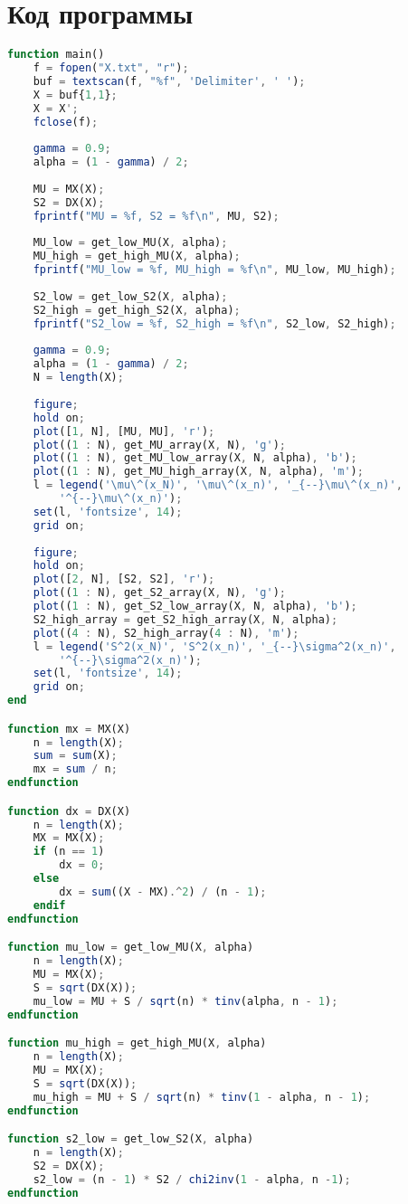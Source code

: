 \chapter{Код программы}

\begin{lstlisting}[language=octave]
function main()
	f = fopen("X.txt", "r");
	buf = textscan(f, "%f", 'Delimiter', ' ');
	X = buf{1,1};
	X = X';
	fclose(f);
	
	gamma = 0.9;
	alpha = (1 - gamma) / 2;
	
	MU = MX(X);
	S2 = DX(X);
	fprintf("MU = %f, S2 = %f\n", MU, S2);
	
	MU_low = get_low_MU(X, alpha);
	MU_high = get_high_MU(X, alpha);
	fprintf("MU_low = %f, MU_high = %f\n", MU_low, MU_high);
	
	S2_low = get_low_S2(X, alpha);
	S2_high = get_high_S2(X, alpha);
	fprintf("S2_low = %f, S2_high = %f\n", S2_low, S2_high);
	
	gamma = 0.9;
	alpha = (1 - gamma) / 2;
	N = length(X);
	
	figure;
	hold on;
	plot([1, N], [MU, MU], 'r');
	plot((1 : N), get_MU_array(X, N), 'g');
	plot((1 : N), get_MU_low_array(X, N, alpha), 'b');
	plot((1 : N), get_MU_high_array(X, N, alpha), 'm');
	l = legend('\mu\^(x_N)', '\mu\^(x_n)', '_{--}\mu\^(x_n)', 
		'^{--}\mu\^(x_n)');
	set(l, 'fontsize', 14);
	grid on;
	
	figure;
	hold on;
	plot([2, N], [S2, S2], 'r');
	plot((1 : N), get_S2_array(X, N), 'g');
	plot((1 : N), get_S2_low_array(X, N, alpha), 'b');
	S2_high_array = get_S2_high_array(X, N, alpha);
	plot((4 : N), S2_high_array(4 : N), 'm');
	l = legend('S^2(x_N)', 'S^2(x_n)', '_{--}\sigma^2(x_n)', 
		'^{--}\sigma^2(x_n)');
	set(l, 'fontsize', 14);
	grid on;
end

function mx = MX(X)
	n = length(X);
	sum = sum(X);
	mx = sum / n;
endfunction

function dx = DX(X)
	n = length(X);
	MX = MX(X);
	if (n == 1)
		dx = 0;
	else
		dx = sum((X - MX).^2) / (n - 1);
	endif
endfunction

function mu_low = get_low_MU(X, alpha)
	n = length(X);
	MU = MX(X);
	S = sqrt(DX(X));
	mu_low = MU + S / sqrt(n) * tinv(alpha, n - 1);
endfunction

function mu_high = get_high_MU(X, alpha)
	n = length(X);
	MU = MX(X);
	S = sqrt(DX(X));
	mu_high = MU + S / sqrt(n) * tinv(1 - alpha, n - 1);
endfunction

function s2_low = get_low_S2(X, alpha)
	n = length(X);
	S2 = DX(X);
	s2_low = (n - 1) * S2 / chi2inv(1 - alpha, n -1);
endfunction


\end{lstlisting}
